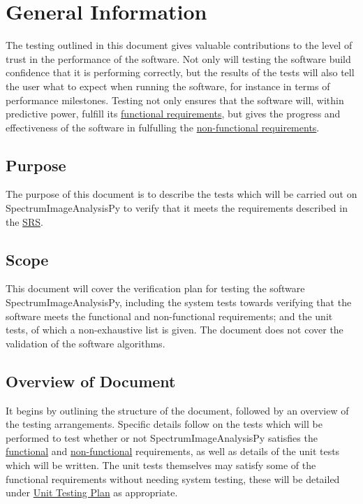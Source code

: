 \documentclass[12pt, titlepage]{article}
\newcommand{\progname}{SpectrumImageAnalysisPy}
\begin{document}
\section{General Information}
The testing outlined in this document gives valuable contributions to the level of trust in the performance of the software. Not only will testing the software build confidence that it is performing correctly, but the results of the tests will also tell the user what to expect when running the software, for instance in terms of performance milestones. Testing not only ensures that the software will, within predictive power, fulfill its \hyperref[subsec:FR]{functional requirements}, but gives the progress and effectiveness of the software in fulfulling the \hyperref[subsec:NfR]{non-functional requirements}.

\subsection{Purpose}
The purpose of this document is to describe the tests which will be carried out on \progname{} to verify that it meets the requirements described in the \hyperref[doc:SRS]{SRS}.

\subsection{Scope}
This document will cover the verification plan for testing the software \progname{}, including the system tests towards verifying that the software meets the functional and non-functional requirements; and the unit tests, of which a non-exhaustive list is given. The document does not cover the validation of the software algorithms. 

\subsection{Overview of Document}
 It begins by outlining the structure of the document, followed by an overview of the testing arrangements. Specific details follow on the tests which will be performed to test whether or not \progname{} satisfies the \hyperref[subsec:FuncReqTest]{functional} and \hyperref[subsec:NonfuncReqTest]{non-functional} requirements, as well as details of the unit tests which will be written. The unit tests themselves may satisfy some of the functional requirements without needing system testing, these will be detailed under \hyperref[sec:UnitTest]{Unit Testing Plan} as appropriate.
\end{document}

